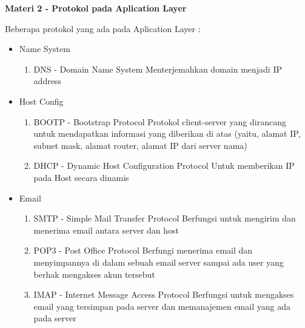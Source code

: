 \documentclass{article}
\begin{document}
    \begin{flushleft}
        \textbf{Materi 2 - Protokol pada Aplication Layer}
        \newline

        Beberapa protokol yang ada pada Aplication Layer :
        \begin{itemize}
            \item Name System
            \begin{enumerate}
                \item DNS - Domain Name System \newline
                Menterjemahkan domain menjadi IP address
            \end{enumerate}

            \item Host Config
            \begin{enumerate}
                \item BOOTP - Bootstrap Protocol \newline
                Protokol client-server yang dirancang untuk mendapatkan informasi yang diberikan di atas (yaitu, alamat IP, subnet mask, alamat router, alamat IP dari server nama)

                \item DHCP - Dynamic Host Configuration Protocol \newline
                Untuk memberikan IP pada Host secara dinamis
            \end{enumerate}

            \item Email
            \begin{enumerate}
                \item SMTP - Simple Mail Transfer Protocol \newline
                Berfungsi untuk mengirim dan menerima email antara server dan host

                \item POP3 - Post Office Protocol \newline
                Berfungi menerima email dan menyimpannya di dalam sebuah email server sampai ada user yang berhak mengakses akun tersebut

                \item IMAP - Internet Message Access Protocol \newline
                Berfungsi untuk mengakses email yang tersimpan pada server dan memanajemen email yang ada pada server
            \end{enumerate}


\end{itemize}
\end{flushleft}
\end{document}
